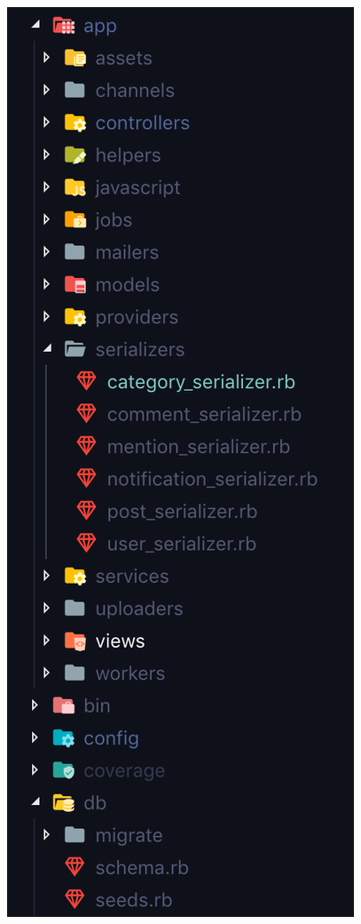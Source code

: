 \documentclass[declaration,shortabstract,polish,inz]{iithesis}
\begin{document}
\begin{figure}[H]
    \centering
    \begin{minipage}[b]{0.4\textwidth}
        \includegraphics[width=\textwidth]{images/serwer1.png}

\end{minipage}
\end{figure}
\end{document}
